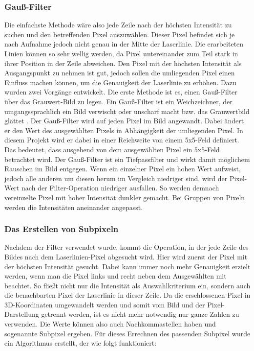 	\subsubsection{Gauß-Filter}
	Die einfachste Methode wäre also jede Zeile nach der höchsten Intensität zu suchen und den betreffenden Pixel auszuwählen. Dieser Pixel befindet sich je nach Aufnahme jedoch nicht genau in der Mitte der Laserlinie. Die erarbeiteten Linien können so sehr \glqq wellig\grqq{} werden, da Pixel untereinander zum Teil stark in ihrer Position in der Zeile abweichen. Den Pixel mit der höchsten Intensität als Ausgangspunkt zu nehmen ist gut, jedoch sollen die umliegenden Pixel einen Einfluss machen können, um die Genauigkeit der Laserlinie zu erhöhen. Dazu wurden zwei Vorgänge entwickelt. \newline
	Die erste Methode ist es, einen Gauß-Filter über das Grauwert-Bild zu legen. Ein Gauß-Filter ist ein Weichzeichner, der umgangssprachlich ein Bild verwischt oder unscharf macht bzw. das Grauwertbild glättet \citep[vgl.][S. 134ff]{nischwitz_bildverarbeitung_2020}. Der Gauß-Filter wird auf jeden Pixel im Bild angewandt. Dabei ändert er den Wert des ausgewählten Pixels in Abhängigkeit der umliegenden Pixel. In diesem Projekt wird er dabei in einer Reichweite von einem 5x5-Feld definiert. Das bedeutet, dass ausgehend von dem ausgewählten Pixel ein 5x5-Feld betrachtet wird. Der Gauß-Filter ist ein Tiefpassfilter und wirkt damit möglichem Rauschen im Bild entgegen. Wenn ein einzelner Pixel ein hohen Wert aufweist, jedoch alle anderen um diesen herum im Vergleich niedriger sind, wird der Pixel-Wert nach der Filter-Operation niedriger ausfallen. So werden demnach vereinzelte Pixel mit hoher Intensität dunkler gemacht. Bei Gruppen von Pixeln werden die Intensitäten aneinander angepasst.
	
	\subsubsection{Das Erstellen von Subpixeln}
	Nachdem der Filter verwendet wurde, kommt die Operation, in der jede Zeile des Bildes nach dem Laserlinien-Pixel abgesucht wird. Hier wird zuerst der Pixel mit der höchsten Intensität gesucht. Dabei kann immer noch mehr  Genauigkeit erzielt werden, wenn man die Pixel links und recht neben dem Ausgewählten mit beachtet. So fließt nicht nur die Intensität als Auswahlkriterium ein, sondern auch die benachbarten Pixel der Laserlinie in dieser Zeile. Da die erschlossenen Pixel in 3D-Koordinaten umgewandelt werden und somit vom Bild und der Pixel-Darstellung getrennt werden, ist es nicht mehr notwendig nur ganze Zahlen zu verwenden. Die Werte können also auch Nachkommastellen haben und sogenannte Subpixel ergeben. Für dieses Errechnen des passenden Subpixel wurde ein Algorithmus erstellt, der wie folgt funktioniert:
	
